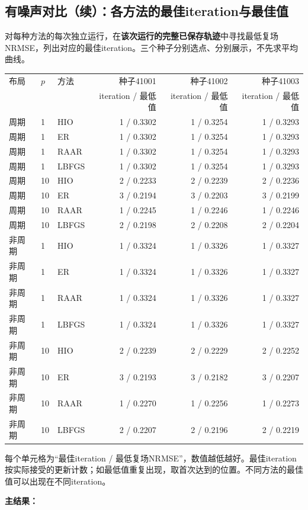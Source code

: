\documentclass[UTF8,a4paper,11pt,fontset=fandol]{ctexart}
\begin{document}
\subsection*{有噪声对比（续）：各方法的最佳iteration与最佳值}
对每种方法的每次独立运行，在\textbf{该次运行的完整已保存轨迹}中寻找最低复场NRMSE，列出对应的最佳iteration。三个种子分别选点、分别展示，不先求平均曲线。
\begin{center}\small\begin{tabular}{ll l rrr}\toprule
布局 & $p$ & 方法 & 种子41001 & 种子41002 & 种子41003\\
 & & & iteration / 最低值 & iteration / 最低值 & iteration / 最低值\\\midrule
周期 & 1 & HIO & 1 / 0.3302 & 1 / 0.3254 & 1 / 0.3293\\
周期 & 1 & ER & 1 / 0.3302 & 1 / 0.3254 & 1 / 0.3293\\
周期 & 1 & RAAR & 1 / 0.3302 & 1 / 0.3254 & 1 / 0.3293\\
周期 & 1 & LBFGS & 1 / 0.3302 & 1 / 0.3254 & 1 / 0.3293\\
周期 & 10 & HIO & 2 / 0.2233 & 2 / 0.2239 & 2 / 0.2236\\
周期 & 10 & ER & 3 / 0.2194 & 3 / 0.2203 & 3 / 0.2199\\
周期 & 10 & RAAR & 1 / 0.2245 & 1 / 0.2246 & 1 / 0.2246\\
周期 & 10 & LBFGS & 2 / 0.2198 & 2 / 0.2208 & 2 / 0.2204\\
非周期 & 1 & HIO & 1 / 0.3324 & 1 / 0.3326 & 1 / 0.3327\\
非周期 & 1 & ER & 1 / 0.3324 & 1 / 0.3326 & 1 / 0.3327\\
非周期 & 1 & RAAR & 1 / 0.3324 & 1 / 0.3326 & 1 / 0.3327\\
非周期 & 1 & LBFGS & 1 / 0.3324 & 1 / 0.3326 & 1 / 0.3327\\
非周期 & 10 & HIO & 2 / 0.2239 & 2 / 0.2229 & 2 / 0.2252\\
非周期 & 10 & ER & 3 / 0.2193 & 3 / 0.2182 & 3 / 0.2207\\
非周期 & 10 & RAAR & 1 / 0.2270 & 1 / 0.2256 & 1 / 0.2273\\
非周期 & 10 & LBFGS & 2 / 0.2207 & 2 / 0.2196 & 2 / 0.2219\\
\bottomrule\end{tabular}\end{center}
每个单元格为“最佳iteration / 最低复场NRMSE”，数值越低越好。最佳iteration按实际接受的更新计数；如最低值重复出现，取首次达到的位置。不同方法的最佳值可以出现在不同iteration。
\par\textbf{主结果：}
\end{document}

